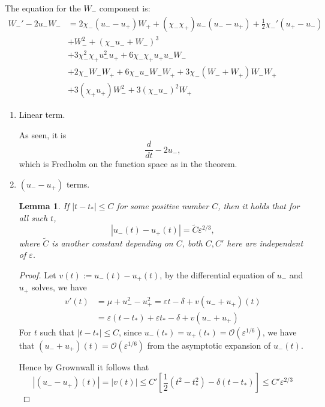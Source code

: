 \documentclass[letterpaper,11pt]{article}
\newcommand{\rmO}{\mathcal{O}}
\newcommand{\eps}{\varepsilon}
\numberwithin{equation}{section}
\theoremstyle{plain}
\newtheorem{lemma}[theorem]{Lemma}
\begin{document}
\begin{enumerate}
\begin{itemize}
The equation for the $W_-$ component is:
\begin{align*}
W_-'  - 2u_-W_-&= 2\chi_-(u_- -u_+)W_+ + (\chi_-\chi_+) u_-(u_- -u_+)+\frac{1}{2}\chi_-'(u_+ -u_-) \\
&+W_-^2+ (\chi_-u_- + W_-)^3\\
&+ 3\chi_-^2\chi_+ u_-^2 u_+ + 6\chi_-\chi_+ u_+ u_-W_-\\
 &+2\chi_-W_-W_+  + 6\chi_- u_- W_- W_+ + 3\chi_-(W_-+W_+)W_-W_+ \\&+3(\chi_+u_+)W_-^2 + 3(\chi_-u_-)^2W_+
\end{align*}

\begin{enumerate}
\item Linear term.

As seen, it is 
\[
\frac{d}{dt} - 2u_-,
\]
which is Fredholm on the function space as in the theorem.


\item $(u_--u_+)$ terms.
\begin{lemma} \label{DifrEsti}
If $|t-t_*|\le C$ for some positive number $C$, then it holds that for all such $t$,
\[
|u_-(t)-u_+(t)| = \tilde{C}\eps^{2/3},
\] 
where $\tilde{C}$ is another constant depending on $C$, both $C,C'$ here are independent of $\eps$.
\end{lemma}

\begin{proof}
Let $v(t):= u_-(t)-u_+(t)$, by the differential equation of $u_-$ and $u_+$ solves, we have
\begin{align*}
v'(t) &= \mu+u_-^2-u_+^2 = \eps t -\delta + v(u_-+u_+)(t)\\
&=\eps(t-t_*)+\eps t_* -\delta + v (u_-+u_+)
\end{align*}
For $t$ such that $|t-t_*|\le C$, since $u_-(t_*)=u_+(t_*) = \rmO(\eps^{1/6})$, we have  that $(u_-+u_+)(t) =\rmO(\eps^{1/6})$ from the asymptotic expansion of $u_-(t)$.

Hence by Grownwall it follows that
\[
\left |(u_--u_+)(t)\right |=|v(t)| \le C' \left[\frac{1}{2}(t^2-t_*^2)-\delta(t-t_*)\right] \le C'\eps^{2/3}
\]
\end{proof}


\end{enumerate}
\end{itemize}
\end{enumerate}
\end{document}
